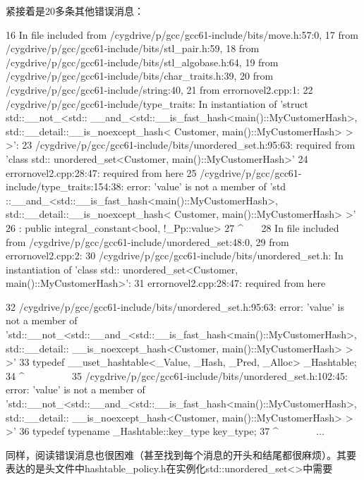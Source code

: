 紧接着是20多条其他错误消息：

{\scriptsize
\begin{shell}
16 In file included from /cygdrive/p/gcc/gcc61-include/bits/move.h:57:0,
17                  from /cygdrive/p/gcc/gcc61-include/bits/stl_pair.h:59,
18                  from /cygdrive/p/gcc/gcc61-include/bits/stl_algobase.h:64,
19 from /cygdrive/p/gcc/gcc61-include/bits/char_traits.h:39,
20                  from /cygdrive/p/gcc/gcc61-include/string:40,
21                  from errornovel2.cpp:1:
22 /cygdrive/p/gcc/gcc61-include/type_traits: In instantiation of 'struct std::__not_<std::
   __and_<std::__is_fast_hash<main()::MyCustomerHash>, std::__detail::__is_noexcept_hash<
   Customer, main()::MyCustomerHash> > >':
23 /cygdrive/p/gcc/gcc61-include/bits/unordered_set.h:95:63: required from 'class std::
   unordered_set<Customer, main()::MyCustomerHash>'
24 errornovel2.cpp:28:47: required from here
25 /cygdrive/p/gcc/gcc61-include/type_traits:154:38: error: 'value' is not a member of 'std
   ::__and_<std::__is_fast_hash<main()::MyCustomerHash>, std::__detail::__is_noexcept_hash<
   Customer, main()::MyCustomerHash> >'
26      : public integral_constant<bool, !_Pp::value>
27                                                  ^~~~
28 In file included from /cygdrive/p/gcc/gcc61-include/unordered_set:48:0,
29                  from errornovel2.cpp:2:
30 /cygdrive/p/gcc/gcc61-include/bits/unordered_set.h: In instantiation of 'class std::
   unordered_set<Customer, main()::MyCustomerHash>':
31 errornovel2.cpp:28:47: required from here
\end{shell}
}
{\scriptsize
\begin{shell}
32 /cygdrive/p/gcc/gcc61-include/bits/unordered_set.h:95:63: error: 'value' is not a member
   of 'std::__not_<std::__and_<std::__is_fast_hash<main()::MyCustomerHash>, std::__detail::
   __is_noexcept_hash<Customer, main()::MyCustomerHash> > >'
33        typedef __uset_hashtable<_Value, _Hash, _Pred, _Alloc> _Hashtable;
34                                                                                  ^~~~~~~~~~
35 /cygdrive/p/gcc/gcc61-include/bits/unordered_set.h:102:45: error: 'value' is not a member
   of 'std::__not_<std::__and_<std::__is_fast_hash<main()::MyCustomerHash>, std::__detail::
   __is_noexcept_hash<Customer, main()::MyCustomerHash> > >'
36 typedef typename _Hashtable::key_type key_type;
37                                                     ^~~~~~~~
...
\end{shell}
}

同样，阅读错误消息也很困难（甚至找到每个消息的开头和结尾都很麻烦）。其要表达的是头文件中hashtable\_policy.h在实例化std::unordered\_set<>中需要

